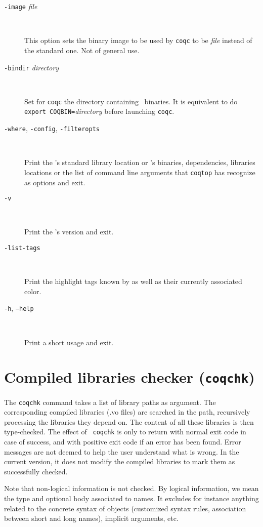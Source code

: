 \begin{description}
\item[{\tt -image} {\em file}]\ 

  This option sets the binary image to be used by {\tt coqc} to be {\em file}
  instead of the standard one. Not of general use.

\item[{\tt -bindir} {\em directory}]\ 

  Set for {\tt coqc} the directory containing \Coq\ binaries.
  It is equivalent to do \texttt{export COQBIN=}{\em directory}
  before launching {\tt coqc}.

\item[{\tt -where}, {\tt -config}, {\tt -filteropts}]\ 

  Print the \Coq's standard library location or \Coq's binaries, dependencies,
  libraries locations or the list of command line arguments that {\tt coqtop} has
  recognize as options and exit.

\item[{\tt -v}]\ 

  Print the \Coq's version and exit.

\item[{\tt -list-tags}]\

  Print the highlight tags known by \Coq as well as their currently associated
  color.

\item[{\tt -h}, {\tt --help}]\ 

  Print a short usage and exit.

\end{description}


\section{Compiled libraries checker ({\tt coqchk})}

The {\tt coqchk} command takes a list of library paths as argument.
The corresponding compiled libraries (.vo files) are searched in the
path, recursively processing the libraries they depend on. The content
of all these libraries is then type-checked. The effect of {\tt
  coqchk} is only to return with normal exit code in case of success,
and with positive exit code if an error has been found. Error messages
are not deemed to help the user understand what is wrong. In the
current version, it does not modify the compiled libraries to mark
them as successfully checked.

Note that non-logical information is not checked. By logical
information, we mean the type and optional body associated to names.
It excludes for instance anything related to the concrete syntax of
objects (customized syntax rules, association between short and long
names), implicit arguments, etc.

